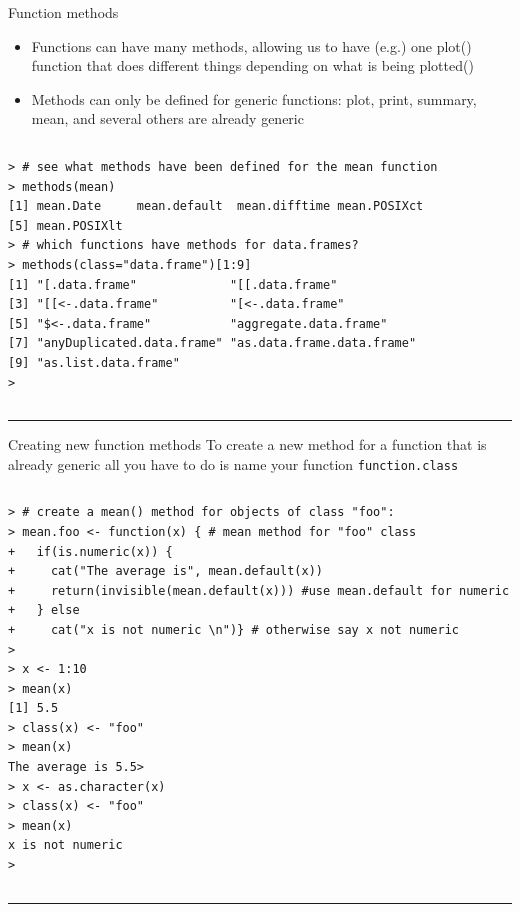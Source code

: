 \documentclass[table,smaller]{beamer}
\begin{document}
\begin{frame}[fragile,label=sec-7-3]{Function methods}
 \begin{itemize}
\item Functions can have many methods, allowing us to have (e.g.) one plot() function that does different things depending on what is being plotted()
\item Methods can only be defined for generic functions: plot, print, summary, mean, and several others are already generic
\end{itemize}

\vspace{-.5em}
\begin{columns}
\begin{block}{}
\begin{verbatim}
> # see what methods have been defined for the mean function
> methods(mean)
[1] mean.Date     mean.default  mean.difftime mean.POSIXct 
[5] mean.POSIXlt 
> # which functions have methods for data.frames?
> methods(class="data.frame")[1:9]
[1] "[.data.frame"             "[[.data.frame"           
[3] "[[<-.data.frame"          "[<-.data.frame"          
[5] "$<-.data.frame"           "aggregate.data.frame"    
[7] "anyDuplicated.data.frame" "as.data.frame.data.frame"
[9] "as.list.data.frame"      
>
\end{verbatim}
\end{block}
\end{columns}
\vspace{.5em}

\rule{\linewidth}{0.5pt}
\end{frame}
\begin{frame}[fragile,label=sec-7-4]{Creating new function methods}
 To create a new method for a function that is already generic all you have to do is name your function \verb~function.class~

\vspace{-.5em}
\begin{columns}
\begin{block}{}
\begin{verbatim}
> # create a mean() method for objects of class "foo":
> mean.foo <- function(x) { # mean method for "foo" class
+   if(is.numeric(x)) {
+     cat("The average is", mean.default(x))
+     return(invisible(mean.default(x))) #use mean.default for numeric
+   } else
+     cat("x is not numeric \n")} # otherwise say x not numeric
> 
> x <- 1:10
> mean(x)
[1] 5.5
> class(x) <- "foo"
> mean(x)
The average is 5.5>  
> x <- as.character(x)
> class(x) <- "foo"
> mean(x)
x is not numeric 
>
\end{verbatim}
\end{block}
\end{columns}
\vspace{.5em}

\rule{\linewidth}{0.5pt}
\end{frame}
\end{document}
